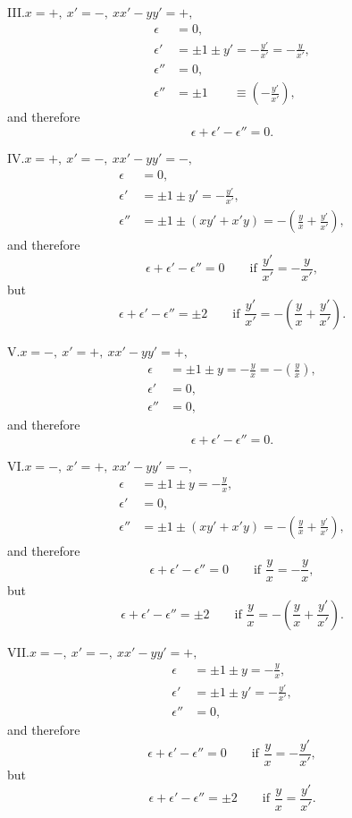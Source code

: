 \documentclass[12pt,a4paper]{article}
\theoremstyle{definition}
\begin{document}
\noindent III.\quad $x = +,\ x' = -,\ xx' - yy' = +,$
\begin{align*}
\epsilon &= 0,\\
\epsilon' &= \pm 1 \pm y' = -\frac{y'}{x'} = -\frac{y}{x'},\\
\epsilon'' &= 0,\\
\epsilon'' &= \pm 1 \qquad \equiv \left(-\frac{y'}{x'}\right),
\end{align*}
and therefore
\[
\epsilon + \epsilon' - \epsilon'' = 0.
\]

\noindent IV.\quad $x = +,\ x' = -,\ xx' - yy' = -,$
\begin{align*}
\epsilon &= 0,\\
\epsilon' &= \pm 1 \pm y' = -\frac{y'}{x'},\\
\epsilon'' &= \pm 1 \pm (xy' + x'y) = -\left(\frac{y}{x} + \frac{y'}{x'}\right),
\end{align*}
and therefore
\[
\epsilon + \epsilon' - \epsilon'' = 0\qquad\text{if } \frac{y'}{x'} = -\frac{y}{x'},
\]
but
\[
\epsilon + \epsilon' - \epsilon'' = \pm 2 \qquad\text{if } \frac{y'}{x'} = -\left(\frac{y}{x} + \frac{y'}{x'}\right).
\]

\noindent V.\quad $x = -,\ x' = +,\ xx' - yy' = +,$
\begin{align*}
\epsilon &= \pm 1 \pm y = -\frac{y}{x} = -\left(\frac{y}{x}\right),\\
\epsilon' &= 0,\\
\epsilon'' &= 0,
\end{align*}
and therefore
\[
\epsilon + \epsilon' - \epsilon'' = 0.
\]

\noindent VI.\quad $x = -,\ x' = +,\ xx' - yy' = -,$
\begin{align*}
\epsilon &= \pm 1 \pm y = -\frac{y}{x},\\
\epsilon' &= 0,\\
\epsilon'' &= \pm 1 \pm (xy' + x'y) = -\left(\frac{y}{x} + \frac{y'}{x'}\right),
\end{align*}
and therefore
\[
\epsilon + \epsilon' - \epsilon'' = 0\qquad\text{if } \frac{y}{x} = -\frac{y}{x},
\]
but
\[
\epsilon + \epsilon' - \epsilon'' = \pm 2 \qquad\text{if } \frac{y}{x} = -\left(\frac{y}{x} + \frac{y'}{x'}\right).
\]

\noindent VII.\quad $x = -,\ x' = -,\ xx' - yy' = +,$
\begin{align*}
\epsilon &= \pm 1 \pm y = -\frac{y}{x},\\
\epsilon' &= \pm 1 \pm y' = -\frac{y'}{x'},\\
\epsilon'' &= 0,
\end{align*}
and therefore
\[
\epsilon + \epsilon' - \epsilon'' = 0\qquad\text{if } \frac{y}{x} = -\frac{y'}{x'},
\]
but
\[
\epsilon + \epsilon' - \epsilon'' = \pm 2 \qquad\text{if } \frac{y}{x} = \frac{y'}{x'}.
\]
\end{document}
